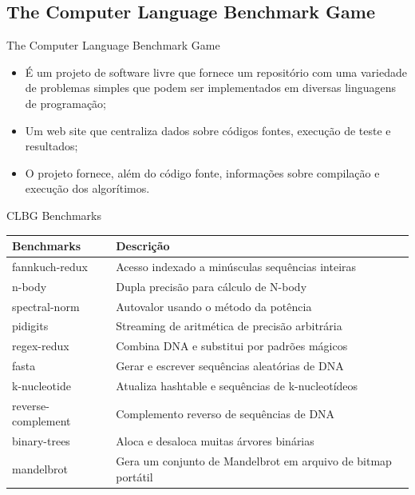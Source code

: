 \subsection{The Computer Language Benchmark Game}
\begin{frame}{The Computer Language Benchmark Game}
    \begin{itemize}
        \item É um projeto de software livre que fornece um repositório com uma variedade de problemas simples que podem ser implementados em diversas linguagens de programação;
        \item Um web site que centraliza dados sobre códigos fontes, execução de teste e resultados;
        \item O projeto fornece, além do código fonte, informações sobre compilação e execução dos algorítimos.
    \end{itemize}
\end{frame}
\begin{frame}{CLBG Benchmarks}
	\centering
	
	\label{tbl:clbg_benchmarks}
	\begin{table}[h]
        \begin{tabular}{l|l}
        \textbf{Benchmarks} & \textbf{Descrição}   \\
        \hline
		fannkuch-redux      & Acesso indexado a minúsculas sequências inteiras            \\
		\hline
        n-body              & Dupla precisão para cálculo de N-body                       \\
		\hline
        spectral-norm       & Autovalor usando o método da potência                       \\
		\hline
        pidigits            & Streaming de aritmética de precisão arbitrária             \\
		\hline
        regex-redux         & Combina DNA e substitui por padrões mágicos                 \\
		\hline
        fasta               & Gerar e escrever sequências aleatórias de DNA               \\
		\hline
        k-nucleotide        & Atualiza hashtable e sequências de k-nucleotídeos           \\
		\hline
        reverse-complement  & Complemento reverso de sequências de DNA                     \\
		\hline
        binary-trees        & Aloca e desaloca muitas árvores binárias                    \\
		\hline
        mandelbrot          & Gera um conjunto de Mandelbrot em arquivo de bitmap portátil \\
    \end{tabular}
	\end{table}
\end{frame}

